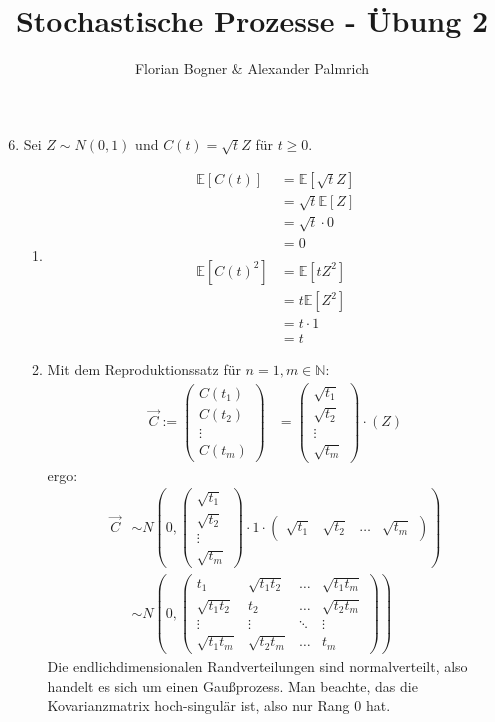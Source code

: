 \documentclass[a4paper,11pt,notitlepage,fullpage]{article}
\newcommand{\E}{\mathbb{E}}
\begin{document}
\author{Florian Bogner \& Alexander Palmrich}
\title{Stochastische Prozesse - Übung 2}
\maketitle

\begin{enumerate}
\setcounter{enumi}{5}
\item Sei $Z\sim N(0,1)$ und $C(t)=\sqrt{t}Z$ für $t\geq0$.
\begin{enumerate}
\item
\begin{align*}
\E[C(t)] &= \E[\sqrt{t}Z]\\
&=\sqrt{t}\E[Z]\\
&=\sqrt{t}\cdot0\\
&= 0\\
\\
\E[C(t)^2] &= \E[tZ^2]\\
&=t\E[Z^2]\\
&=t\cdot1\\
&=t
\end{align*}

\item Mit dem Reproduktionssatz für $n = 1, m \in \mathbb N$:
\begin{align*}
\vec C := \begin{pmatrix}
C(t_1) \\ C(t_2) \\ \vdots \\ C(t_m)
\end{pmatrix} &=
\begin{pmatrix}
\sqrt{t_1} \\ \sqrt{t_2} \\ \vdots \\ \sqrt{t_m}
\end{pmatrix} \cdot (Z)
\end{align*}
ergo:
\begin{align*}
\vec C &\sim N\left(0, \begin{pmatrix}
\sqrt{t_1} \\ \sqrt{t_2} \\ \vdots \\ \sqrt{t_m}
\end{pmatrix} \cdot 1 \cdot \begin{pmatrix}
\sqrt{t_1} & \sqrt{t_2} & \hdots & \sqrt{t_m}
\end{pmatrix}\right) \\
&\sim N\left(0, \begin{pmatrix}
t_1 & \sqrt{t_1t_2} & \hdots & \sqrt{t_1t_m} \\
\sqrt{t_1t_2} & t_2 & \hdots & \sqrt{t_2t_m} \\
\vdots & \vdots & \ddots & \vdots \\
\sqrt{t_1t_m} & \sqrt{t_2t_m} & \hdots & t_m
\end{pmatrix}\right)
\end{align*}
Die endlichdimensionalen Randverteilungen sind normalverteilt, also handelt es sich um einen Gaußprozess. Man beachte, das die Kovarianzmatrix hoch-singulär ist, also nur Rang 0 hat.


\end{enumerate}
\end{enumerate}
\end{document}
